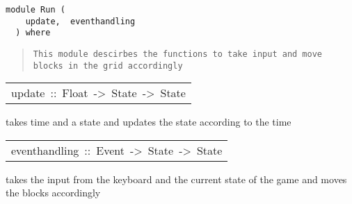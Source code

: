 \label{module:Run}
\haddockbeginheader
{\haddockverb\begin{verbatim}
module Run (
    update,  eventhandling
  ) where\end{verbatim}}
\haddockendheader

\begin{quote}
{\haddockverb\begin{verbatim}
This module descirbes the functions to take input and move blocks in the grid accordingly\end{verbatim}}
\end{quote}

\begin{haddockdesc}
\item[\begin{tabular}{@{}l}
update\ ::\ Float\ ->\ State\ ->\ State
\end{tabular}]\haddockbegindoc
{} takes time and a state and updates the state according to the time \par

\end{haddockdesc}
\begin{haddockdesc}
\item[\begin{tabular}{@{}l}
eventhandling\ ::\ Event\ ->\ State\ ->\ State
\end{tabular}]\haddockbegindoc
{} takes the input from the keyboard and the current state of the game and moves the blocks accordingly\par

\end{haddockdesc}
